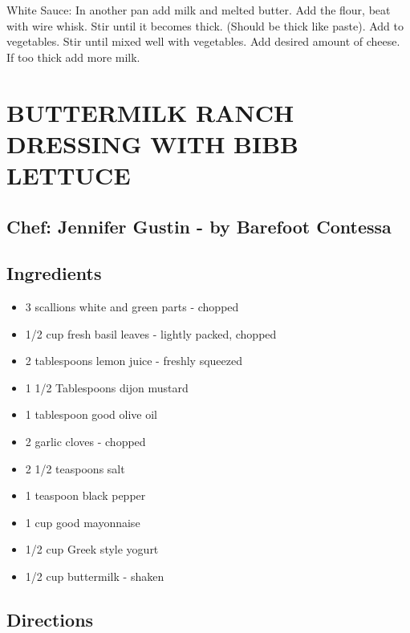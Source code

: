 \documentclass[
]{book}
\providecommand{\tightlist}{%
  \setlength{\itemsep}{0pt}\setlength{\parskip}{0pt}}
\begin{document}
White Sauce:
In another pan add milk and melted butter. Add the flour, beat with wire whisk.
Stir until it becomes thick. (Should be thick like paste). Add to vegetables.
Stir until mixed well with vegetables.
Add desired amount of cheese. If too thick add more milk.

\hypertarget{buttermilk-ranch-dressing-with-bibb-lettuce}{%
\section*{BUTTERMILK RANCH DRESSING WITH BIBB LETTUCE}\label{buttermilk-ranch-dressing-with-bibb-lettuce}}


\hypertarget{chef-jennifer-gustin---by-barefoot-contessa}{%
\subsection*{Chef: Jennifer Gustin - by Barefoot Contessa}\label{chef-jennifer-gustin---by-barefoot-contessa}}


\hypertarget{ingredients-16}{%
\subsection*{Ingredients}\label{ingredients-16}}


\begin{itemize}
\tightlist
\item
  3 scallions white and green parts - chopped
\item
  1/2 cup fresh basil leaves - lightly packed, chopped
\item
  2 tablespoons lemon juice - freshly squeezed
\item
  1 1/2 Tablespoons dijon mustard
\item
  1 tablespoon good olive oil
\item
  2 garlic cloves - chopped
\item
  2 1/2 teaspoons salt
\item
  1 teaspoon black pepper
\item
  1 cup good mayonnaise
\item
  1/2 cup Greek style yogurt
\item
  1/2 cup buttermilk - shaken
\end{itemize}

\hypertarget{directions-16}{%
\subsection*{Directions}\label{directions-16}}
\end{document}
